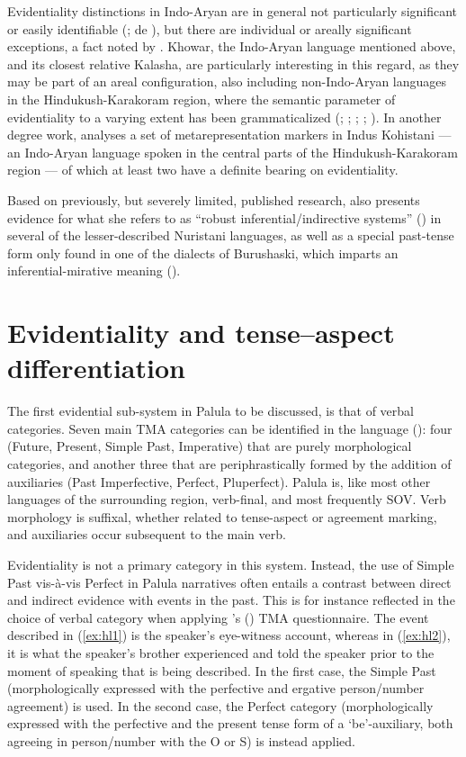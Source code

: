 \documentclass[output=paper]{langsci/langscibook}
\begin{document}
Evidentiality distinctions in Indo-Aryan are in general not particularly significant or easily identifiable (\citealt[279--291]{Masica1991}; de \citealt{Haan2013}), but there are individual or areally significant exceptions, a fact noted by \cite{Bashir2006}. Khowar, the Indo-Aryan language mentioned above, and its closest relative Kalasha, are particularly interesting in this regard, as they may be part of an areal configuration, also including non-Indo-Aryan languages in the Hindukush-Karakoram region, where the semantic parameter of evidentiality to a varying extent has been grammaticalized (\citealt{Bashir1988}; \citeyear{Bashir1996a}; \citeyear{Bashir1996b}; \citeyear[823]{Bashir2003}; \citeyear{Bashir2010}). In another degree work, \cite{Lubberger2014} analyses a set of metarepresentation markers in Indus Kohistani — an Indo-Aryan language spoken in the central parts of the Hindukush-Karakoram region — of which at least two have a definite bearing on evidentiality. 

Based on previously, but severely limited, published research, \citeauthor{Bashir2006} also presents evidence for what she refers to as “robust inferential/indirective systems” (\citeyear{Bashir2006}) in several of the lesser-described Nuristani languages, as well as a special past-tense form only found in one of the dialects of Burushaski, which imparts an inferential-mirative meaning (\citeyear[14]{Bashir2010}). 


\section{Evidentiality and tense--aspect differentiation}\label{s:hl3}

The first evidential sub-system in Palula to be discussed, is that of verbal categories. Seven main TMA categories can be identified in the language (\citealt[247--263]{Liljegren2016}): four (Future, Present, Simple Past, Imperative) that are purely morphological categories, and another three that are periphrastically formed by the addition of auxiliaries (Past Imperfective, Perfect, Pluperfect). Palula is, like most other languages of the surrounding region, verb-final, and most frequently SOV. Verb morphology is suffixal, whether related to tense-aspect or agreement marking, and auxiliaries occur subsequent to the main verb.

Evidentiality is not a primary category in this system. Instead, the use of Simple Past vis-à-vis Perfect in Palula narratives often entails a contrast between direct and indirect evidence with events in the past. This is for instance reflected in the choice of verbal category when applying \citeauthor{Dahl1985}’s (\citeyear{Dahl1985}) TMA questionnaire. The event described in (‎\ref{ex:hl1}) is the speaker’s eye-witness account, whereas in ‎(\ref{ex:hl2}), it is what the speaker’s brother experienced and told the speaker prior to the moment of speaking that is being described. In the first case, the Simple Past (morphologically expressed with the perfective and ergative person/number agreement) is used. In the second case, the Perfect category (morphologically expressed with the perfective and the present tense form of a ‘be’-auxiliary, both agreeing in person/number with the O or S) is instead applied.
\end{document}
